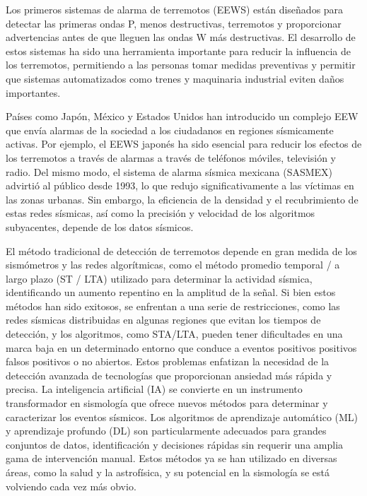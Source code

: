 Los primeros sistemas de alarma de terremotos (EEWS) están diseñados para detectar las primeras ondas P, menos destructivas, terremotos y proporcionar advertencias antes de que lleguen las ondas W más destructivas. El desarrollo de estos sistemas ha sido una herramienta importante para reducir la influencia de los terremotos, permitiendo a las personas tomar medidas preventivas y permitir que sistemas automatizados como trenes y maquinaria industrial eviten daños importantes.

Países como Japón, México y Estados Unidos han introducido un complejo EEW que envía alarmas de la sociedad a los ciudadanos en regiones sísmicamente activas. Por ejemplo, el EEWS japonés ha sido esencial para reducir los efectos de los terremotos a través de alarmas a través de teléfonos móviles, televisión y radio. Del mismo modo, el sistema de alarma sísmica mexicana (SASMEX) advirtió al público desde 1993, lo que redujo significativamente a las víctimas en las zonas urbanas. Sin embargo, la eficiencia de la densidad y el recubrimiento de estas redes sísmicas, así como la precisión y velocidad de los algoritmos subyacentes, depende de los datos sísmicos.

El método tradicional de detección de terremotos depende en gran medida de los sismómetros y las redes algorítmicas, como el método promedio temporal / a largo plazo (ST / LTA) utilizado para determinar la actividad sísmica, identificando un aumento repentino en la amplitud de la señal. Si bien estos métodos han sido exitosos, se enfrentan a una serie de restricciones, como las redes sísmicas distribuidas en algunas regiones que evitan los tiempos de detección, y los algoritmos, como STA/LTA, pueden tener dificultades en una marca baja en un determinado entorno que conduce a eventos positivos positivos falsos positivos o no abiertos. Estos problemas enfatizan la necesidad de la detección avanzada de tecnologías que proporcionan ansiedad más rápida y precisa. La inteligencia artificial (IA) se convierte en un instrumento transformador en sismología que ofrece nuevos métodos para determinar y caracterizar los eventos sísmicos. Los algoritmos de aprendizaje automático (ML) y aprendizaje profundo (DL) son particularmente adecuados para grandes conjuntos de datos, identificación y decisiones rápidas sin requerir una amplia gama de intervención manual. Estos métodos ya se han utilizado en diversas áreas, como la salud y la astrofísica, y su potencial en la sismología se está volviendo cada vez más obvio.



